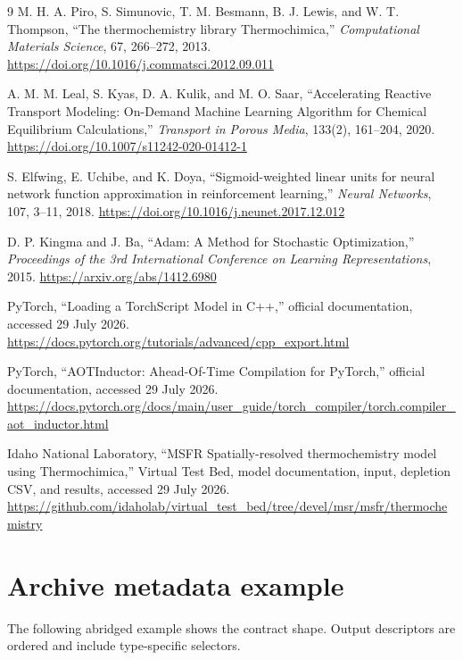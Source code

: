 \documentclass[11pt]{article}
\begin{document}
\begin{thebibliography}{9}
  M. H. A. Piro, S. Simunovic, T. M. Besmann, B. J. Lewis, and W. T. Thompson,
  ``The thermochemistry library Thermochimica,''
  \emph{Computational Materials Science}, 67, 266--272, 2013.
  \url{https://doi.org/10.1016/j.commatsci.2012.09.011}

  A. M. M. Leal, S. Kyas, D. A. Kulik, and M. O. Saar,
  ``Accelerating Reactive Transport Modeling: On-Demand Machine Learning Algorithm for Chemical
  Equilibrium Calculations,''
  \emph{Transport in Porous Media}, 133(2), 161--204, 2020.
  \url{https://doi.org/10.1007/s11242-020-01412-1}

  S. Elfwing, E. Uchibe, and K. Doya,
  ``Sigmoid-weighted linear units for neural network function approximation in reinforcement
  learning,''
  \emph{Neural Networks}, 107, 3--11, 2018.
  \url{https://doi.org/10.1016/j.neunet.2017.12.012}

  D. P. Kingma and J. Ba,
  ``Adam: A Method for Stochastic Optimization,''
  \emph{Proceedings of the 3rd International Conference on Learning Representations}, 2015.
  \url{https://arxiv.org/abs/1412.6980}

  PyTorch,
  ``Loading a TorchScript Model in C++,''
  official documentation, accessed 29 July 2026.
  \url{https://docs.pytorch.org/tutorials/advanced/cpp_export.html}

  PyTorch,
  ``AOTInductor: Ahead-Of-Time Compilation for PyTorch,''
  official documentation, accessed 29 July 2026.
  \url{https://docs.pytorch.org/docs/main/user_guide/torch_compiler/torch.compiler_aot_inductor.html}

  Idaho National Laboratory,
  ``MSFR Spatially-resolved thermochemistry model using Thermochimica,'' Virtual Test Bed,
  model documentation, input, depletion CSV, and results, accessed 29 July 2026.
  \url{https://github.com/idaholab/virtual_test_bed/tree/devel/msr/msfr/thermochemistry}
\end{thebibliography}

\appendix

\section{Archive metadata example}

The following abridged example shows the contract shape.  Output descriptors are ordered and
include type-specific selectors.
\end{document}
